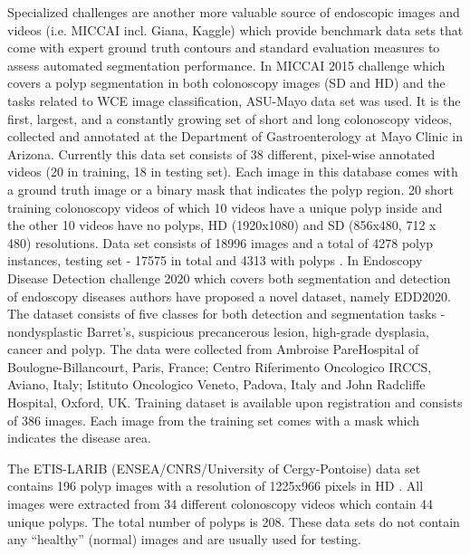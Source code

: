\documentclass[preprint]{article}
\begin{document}
Specialized challenges are another more valuable source of endoscopic images and videos (i.e. MICCAI incl. Giana, Kaggle) which provide benchmark data sets that come with expert ground truth contours and standard evaluation measures to assess automated segmentation performance. 
In MICCAI 2015 challenge which covers a polyp segmentation in both colonoscopy images (SD and HD) and the tasks related to WCE image classification, ASU-Mayo data set was used. It is the first, largest, and a constantly growing set of short and long colonoscopy videos, collected and annotated at the Department of Gastroenterology at Mayo Clinic in Arizona. Currently this data set consists of 38 different, pixel-wise annotated videos (20 in training, 18 in testing set). Each image in this database comes with a ground truth image or a binary mask that indicates the polyp region. 20 short training colonoscopy videos of which 10 videos have a unique polyp inside and the other 10 videos have no polyps, HD (1920x1080) and SD (856x480, 712 x 480)  resolutions. Data set consists of 18996 images and a total of 4278 polyp instances, testing set -  17575 in total and 4313 with polyps \cite{Mayo}. 
In Endoscopy Disease Detection challenge 2020\cite{EDD2020} which covers both segmentation and detection of endoscopy diseases authors have proposed a novel dataset, namely EDD2020. The dataset consists of five classes for both detection and segmentation tasks - nondysplastic Barret's, suspicious precancerous lesion, high-grade dysplasia, cancer and polyp. The data were collected from Ambroise PareHospital of Boulogne-Billancourt, Paris, France; Centro Riferimento Oncologico IRCCS, Aviano, Italy; Istituto Oncologico Veneto, Padova, Italy and John Radcliffe Hospital, Oxford, UK. Training dataset is available upon registration and consists of 386 images. Each image from the training set comes with a mask which indicates the disease area.

The ETIS-LARIB (ENSEA/CNRS/University of Cergy-Pontoise) data set contains 196 polyp images with a resolution of 1225x966 pixels in HD \cite{ETIS}. All images were extracted from 34 different colonoscopy videos which contain 44 unique polyps. The total number of polyps is 208. These data sets do not contain any “healthy” (normal) images and are usually used for testing.
\end{document}
